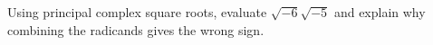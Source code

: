 Using principal complex square roots, evaluate $\sqrt{-6}\sqrt{-5}$ and explain why combining the radicands gives the wrong sign.
